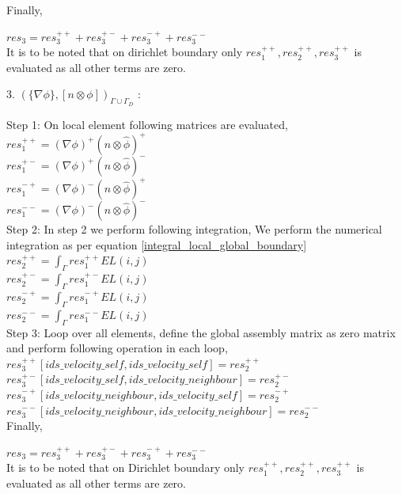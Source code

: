 \documentclass[a4paper]{book}
\begin{document}
Finally,

$res_3 = res_3^{++} + res_3^{+-} + res_3^{-+} + res_3^{--}$\\

It is to be noted that on dirichlet boundary only $res_1^{++}, res_2^{++}, res_3^{++}$ is evaluated as all other terms are zero.

3. $(\lbrace \nabla \phi \rbrace, [n \otimes \phi])_{\Gamma \cup \Gamma_D}$ :

Step 1: On local element following matrices are evaluated,\\

$res_1^{++} = (\nabla \phi)^+ (n \otimes \hat{\phi})^+$\\
$res_1^{+-} = (\nabla \phi)^+ (n \otimes \hat{\phi})^-$\\
$res_1^{-+} = (\nabla \phi)^- (n \otimes \hat{\phi})^+$\\
$res_1^{--} = (\nabla \phi)^- (n \otimes \hat{\phi})^-$\\

Step 2: In step 2 we perform following integration, 
We perform the numerical integration as per equation \ref{integral_local_global_boundary}
\\ 
$res_2^{++} = \int_{\Gamma} res_1^{++} EL(i,j)$\\
$res_2^{+-} = \int_{\Gamma} res_1^{+-} EL(i,j)$\\
$res_2^{-+} = \int_{\Gamma} res_1^{-+} EL(i,j)$\\
$res_2^{--} = \int_{\Gamma} res_1^{--} EL(i,j)$\\

Step 3: Loop over all elements, define the global assembly matrix as zero matrix and perform following operation in each loop,
\\
$res_3^{++}[ids\_velocity\_self,ids\_velocity\_self] = res_2^{++}$\\
$res_3^{+-}[ids\_velocity\_self,ids\_velocity\_neighbour] = res_2^{+-}$\\
$res_3^{-+}[ids\_velocity\_neighbour,ids\_velocity\_self] = res_2^{-+}$\\
$res_3^{--}[ids\_velocity\_neighbour,ids\_velocity\_neighbour] = res_2^{--}$\\

Finally,

$res_3 = res_3^{++} + res_3^{+-} + res_3^{-+} + res_3^{--}$\\

It is to be noted that on Dirichlet boundary only $res_1^{++}, res_2^{++}, res_3^{++}$ is evaluated as all other terms are zero.
\end{document}
